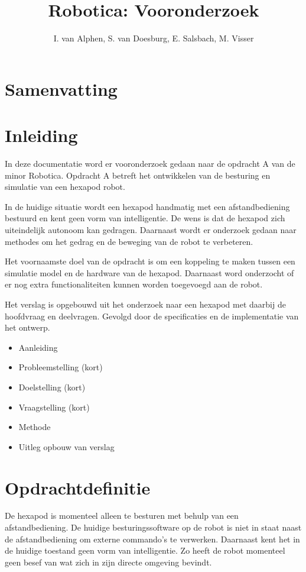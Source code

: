 \documentclass[10pt,a4paper]{article}
\title{Robotica: Vooronderzoek}
\author{I. van Alphen, S. van Doesburg, E.  Salsbach, M. Visser}
\begin{document}
\maketitle

\tableofcontents

\section{Samenvatting}

\newpage

\section{Inleiding}
In deze documentatie word er vooronderzoek gedaan naar de opdracht A van de minor Robotica. Opdracht A betreft het ontwikkelen van de besturing en simulatie van een hexapod robot.

In de huidige situatie wordt een hexapod handmatig met een afstandbediening bestuurd en kent geen vorm van intelligentie. De wens is dat de hexapod zich uiteindelijk autonoom kan gedragen. Daarnaast wordt er onderzoek gedaan naar methodes om het gedrag en de beweging van de robot te verbeteren.

Het voornaamste doel van de opdracht is om een koppeling te maken tussen een simulatie model en de hardware van de hexapod. Daarnaast word onderzocht of er nog extra functionaliteiten kunnen worden toegevoegd aan de robot.

Het verslag is opgebouwd uit het onderzoek naar een hexapod met daarbij de hoofdvraag en deelvragen. Gevolgd door de specificaties en de implementatie van het ontwerp.


\begin{itemize}
\setlength\itemsep{0em}
\item Aanleiding 
\item Probleemstelling (kort) 
\item Doelstelling (kort) 
\item Vraagstelling (kort) 
\item Methode 
\item Uitleg opbouw van verslag
\end{itemize}

\newpage

\section{Opdrachtdefinitie}
De hexapod is momenteel alleen te besturen met behulp van een afstandbediening. De huidige besturingssoftware op de robot is niet in staat naast de afstandbediening om externe commando's te verwerken. Daarnaast kent het in de huidige toestand geen vorm van intelligentie. Zo heeft de robot momenteel geen besef van wat zich in zijn directe omgeving bevindt.
\end{document}
